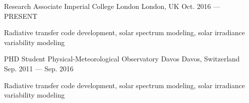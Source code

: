 

\begin{cventries}

  \cventry
    {Research Associate} %
    {Imperial College London} %
    {London, UK} %
    {Oct. 2016 --- PRESENT} %
    {
      \begin{cvitems} %
        \item {Radiative transfer code development, solar spectrum modeling, solar irradiance variability modeling}
      \end{cvitems}
    }

  \cventry
    {PHD Student} %
    {Physical-Meteorological Observatory Davos} %
    {Davos, Switzerland} %
    {Sep. 2011 --- Sep. 2016} %
    {
      \begin{cvitems} %
        \item {Radiative transfer code development, solar spectrum modeling, solar irradiance variability modeling}
      \end{cvitems}
    }


\end{cventries}
